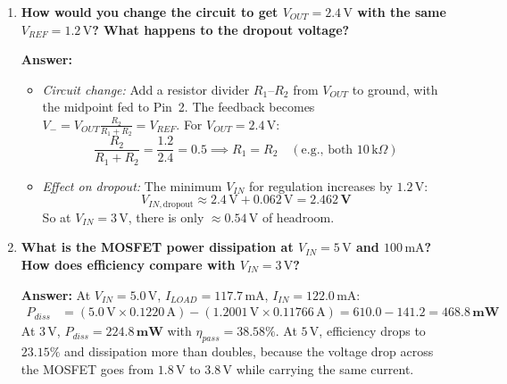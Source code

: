 \documentclass[11pt,a4paper]{article}
\begin{document}
\begin{enumerate}[label=\textbf{Q\arabic*.}, leftmargin=2.0em, itemsep=0.8em]
    \textbf{Answer:} An NMOS source follower can only source current, not sink it. With no load and no bleeder, the output node has no discharge path. Leakage or gate-capacitor feedthrough slowly charges $C_{OUT}$, and even though the op-amp pulls $V_G$ to its negative rail to try to turn the MOSFET off, it cannot pull trapped charge out of the source node. So $V_{OUT}$ floats upward above $V_{REF}$, possibly drifting toward $V_{IN}$. The bleeder provides a continuous $\approx 1\,\text{mA}$ discharge path to prevent this.

    \item \textbf{How would you change the circuit to get $V_{OUT} = 2.4\,\text{V}$ with the same $V_{REF} = 1.2\,\text{V}$? What happens to the dropout voltage?}

    \textbf{Answer:}
    \begin{itemize}[leftmargin=1.2em, itemsep=0.1em]
        \item \textit{Circuit change:} Add a resistor divider $R_1$--$R_2$ from $V_{OUT}$ to ground, with the midpoint fed to Pin~2. The feedback becomes $V_- = V_{OUT} \frac{R_2}{R_1+R_2} = V_{REF}$. For $V_{OUT} = 2.4\,\text{V}$:
        \begin{equation}
            \frac{R_2}{R_1 + R_2} = \frac{1.2}{2.4} = 0.5 \implies R_1 = R_2 \quad (\text{e.g., both } 10\,\text{k}\Omega)
        \end{equation}
        \item \textit{Effect on dropout:} The minimum $V_{IN}$ for regulation increases by $1.2\,\text{V}$:
        \begin{equation}
            V_{IN,\text{dropout}} \approx 2.4\,\text{V} + 0.062\,\text{V} = \mathbf{2.462\,\text{V}}
        \end{equation}
        So at $V_{IN} = 3\,\text{V}$, there is only $\approx 0.54\,\text{V}$ of headroom.
    \end{itemize}

    \item \textbf{What is the MOSFET power dissipation at $V_{IN} = 5\,\text{V}$ and $100\,\text{mA}$? How does efficiency compare with $V_{IN} = 3\,\text{V}$?}

    \textbf{Answer:} At $V_{IN} = 5.0\,\text{V}$, $I_{LOAD} = 117.7\,\text{mA}$, $I_{IN} = 122.0\,\text{mA}$:
    \begin{align}
        P_{diss} &= (5.0\,\text{V} \times 0.1220\,\text{A}) - (1.2001\,\text{V} \times 0.11766\,\text{A}) = 610.0 - 141.2 = \mathbf{468.8\,\text{mW}}
    \end{align}
    At $3\,\text{V}$, $P_{diss} = \mathbf{224.8\,\text{mW}}$ with $\eta_{pass} = \mathbf{38.58\%}$. At $5\,\text{V}$, efficiency drops to $\mathbf{23.15\%}$ and dissipation more than doubles, because the voltage drop across the MOSFET goes from $1.8\,\text{V}$ to $3.8\,\text{V}$ while carrying the same current.


\end{enumerate}
\end{document}
